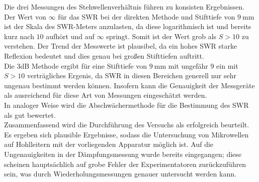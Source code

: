 Die drei Messungen des Stehwellenverhältnis führen zu konsisten Ergebnissen. Der Wert von $\infty$ für das SWR bei der direkten Methode und Stifttiefe von $\SI{9}{\milli\meter}$ ist der Skala des SWR-Meters anzulasten, da diese logarithmisch ist und bereits kurz nach $10$ aufhört und auf $\infty$ springt. Somit ist der Wert grob als $S > 10$ zu verstehen. Der Trend der Messwerte ist plausibel, da ein hohes SWR starke Reflexion bedeutet und dies genau bei großen Stifttiefen auftritt.\\
Die 3dB Methode ergibt für eine Stifttiefe von $\SI{9}{\milli\meter}$ mit ungefähr $9$ ein mit $S > 10$ verträgliches Ergenis, da SWR in diesen Bereichen generell nur sehr ungenau bestimmt werden können. Insofern kann die Genauigkeit der Messgeräte als ausreichend für diese Art von Messungen eingeschätzt werden.\\
In analoger Weise wird die Abschwächermethode für die Bestimmung des SWR als gut bewertet.\\
Zusammenfassend wird die Durchführung des Versuchs als erfolgreich beurteilt. Es ergeben sich plausible Ergebnisse, sodass die Untersuchung von Mikrowellen auf Hohlleitern mit der vorliegenden Apparatur möglich ist. Auf die Ungenauigkeiten in der Dämpfungsmessung wurde bereits eingegangen; diese scheinen hauptsächlich auf grobe Fehler der Experimentatoren zurückzuführen sein, was durch Wiederholungsmessungen genauer untersucht werden kann.

